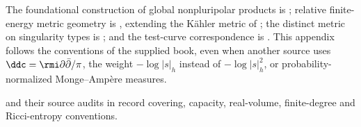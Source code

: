 The foundational construction of global nonpluripolar products is
\cite{BEGZ10}; relative finite-energy metric geometry is
\cite[\S4.3]{XiaBook}, extending the K\"ahler metric of \cite{Dar15};
the distinct metric on singularity types is \cite{DDNLmetric}; and the test-curve correspondence is
\cite{RWN14}. This appendix follows the conventions of the supplied book,
even when another source uses \(\ddc=\rmi\partial\bar\partial/\pi\), the
weight \(-\log|s|_h\) instead of \(-\log|s|_h^2\), or probability-normalized
Monge--Amp\`ere measures.

and their source audits in
record covering, capacity, real-volume, finite-degree and Ricci-entropy conventions.
